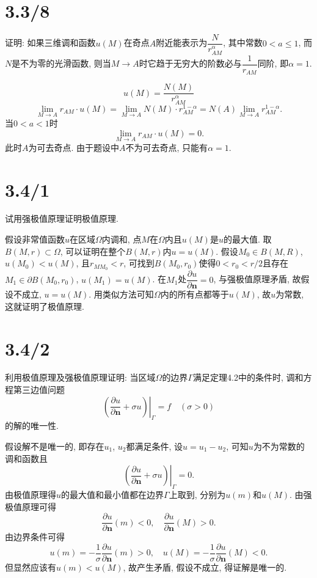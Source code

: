 \documentclass[11pt,a4paper]{article}
\author{刘逸灏 (515370910207)}
\begin{document}
\maketitle

\section{3.3/8}
\begin{problem}
证明: 如果三维调和函数$u(M)$在奇点$A$附近能表示为$\dfrac{N}{r^\alpha_{AM}}$, 其中常数$0<a\leqslant1$, 而$N$是不为零的光滑函数, 则当$M\to A$时它趋于无穷大的阶数必与$\dfrac{1}{r_{AM}}$同阶, 即$\alpha=1$.
\end{problem}
$$u(M)=\frac{N(M)}{r_{AM}^\alpha}$$
$$\lim_{M\to A}r_{AM}\cdot u(M)=\lim_{M\to A}N(M)\cdot r^{1-\alpha}_{AM}=N(A)\lim_{M\to A}r^{1-\alpha}_{AM}.$$
当$0<a<1$时
$$\lim_{M\to A}r_{AM}\cdot u(M)=0.$$
此时$A$为可去奇点. 由于题设中$A$不为可去奇点, 只能有$\alpha=1$.

\section{3.4/1}
\begin{problem}
试用强极值原理证明极值原理.
\end{problem}

假设非常值函数$u$在区域$\Omega$内调和, 点$M$在$\Omega$内且$u(M)$是$u$的最大值. 取$B(M,r)\subset\Omega$, 可以证明在整个$B(M,r)$内$u=u(M)$. 假设$M_0\in B(M,R)$, $u(M_0)<u(M)$, 且$r_{MM_0}<r$, 可找到$B(M_0,r_0)$使得$0<r_0<r/2$且存在$M_1\in\partial B(M_0,r_0)$, $u(M_1)=u(M)$.
在$M_1$处$\dfrac{\partial u}{\partial\mathbf{n}}=0$, 与强极值原理矛盾, 故假设不成立, $u=u(M)$. 用类似方法可知$\Omega$内的所有点都等于$u(M)$, 故$u$为常数, 这就证明了极值原理.


\section{3.4/2}
\begin{problem}
利用极值原理及强极值原理证明: 当区域$\Omega$的边界$\Gamma$满足定理4.2中的条件时, 调和方程第三边值问题
$$\left.\left(\frac{\partial u}{\partial\mathbf{n}}+\sigma u\right)\right|_{\Gamma}=f\quad (\sigma>0)$$
的解的唯一性.
\end{problem}

假设解不是唯一的, 即存在$u_1$, $u_2$都满足条件, 设$u=u_1-u_2$, 可知$u$为不为常数的调和函数且
$$\left.\left(\frac{\partial u}{\partial\mathbf{n}}+\sigma u\right)\right|_{\Gamma}=0.$$
由极值原理得$u$的最大值和最小值都在边界$\Gamma$上取到, 分别为$u(m)$和$u(M)$. 由强极值原理可得
$$\frac{\partial u}{\partial\mathbf{n}}(m)<0,\quad\frac{\partial u}{\partial\mathbf{n}}(M)>0.$$
由边界条件可得
$$u(m)=-\frac{1}{\sigma}\frac{\partial u}{\partial\mathbf{n}}(m)>0,\quad u(M)=-\frac{1}{\sigma}\frac{\partial u}{\partial\mathbf{n}}(M)<0.$$
但显然应该有$u(m)<u(M)$, 故产生矛盾, 假设不成立, 得证解是唯一的.
\end{document}
